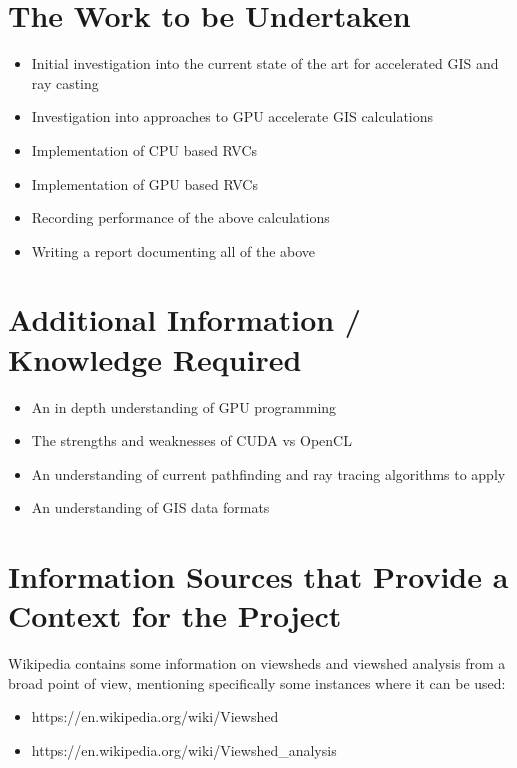 \documentclass[a4paper]{article}
\begin{document}
    \section{The Work to be Undertaken}
        \begin{itemize}
            \item Initial investigation into the current state of the art for accelerated GIS and ray casting
            \item Investigation into approaches to GPU accelerate GIS calculations
            \item Implementation of CPU based RVCs
            \item Implementation of GPU based RVCs
            \item Recording performance of the above calculations
            \item Writing a report documenting all of the above
        \end{itemize}

    \section{Additional Information / Knowledge Required}
        \begin{itemize}
            \item An in depth understanding of GPU programming
            \item The strengths and weaknesses of CUDA vs OpenCL
            \item An understanding of current pathfinding and ray tracing algorithms to apply
            \item An understanding of GIS data formats
        \end{itemize}

    \section{Information Sources that Provide a Context for the Project}
        Wikipedia contains some information on viewsheds and viewshed analysis from a broad point of view, mentioning
        specifically some instances where it can be used:
        \begin{itemize}
            \item https://en.wikipedia.org/wiki/Viewshed
            \item https://en.wikipedia.org/wiki/Viewshed\_analysis
        \end{itemize}
\end{document}
